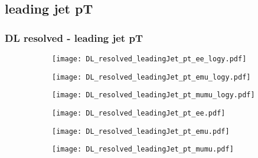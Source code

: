 \documentclass[aspectratio=169,8pt]{beamer}
\begin{document}
\subsection{leading jet pT}
\begin{frame}
\frametitle{DL resolved - leading jet pT}
\begin{figure}
\captionsetup[subfigure]{labelformat=empty}
\begin{subfigure}{0.32\textwidth}
\texttt{[image: DL\_resolved\_leadingJet\_pt\_ee\_logy.pdf]}
\vspace*{-0.15cm}
\end{subfigure}
\hfil
\begin{subfigure}{0.32\textwidth}
\texttt{[image: DL\_resolved\_leadingJet\_pt\_emu\_logy.pdf]}
\vspace*{-0.15cm}
\end{subfigure}
\hfil
\begin{subfigure}{0.32\textwidth}
\texttt{[image: DL\_resolved\_leadingJet\_pt\_mumu\_logy.pdf]}
\vspace*{-0.15cm}
\end{subfigure}
\hfil
\begin{subfigure}{0.32\textwidth}
\texttt{[image: DL\_resolved\_leadingJet\_pt\_ee.pdf]}
\vspace*{-0.15cm}
\end{subfigure}
\hfil
\begin{subfigure}{0.32\textwidth}
\texttt{[image: DL\_resolved\_leadingJet\_pt\_emu.pdf]}
\vspace*{-0.15cm}
\end{subfigure}
\hfil
\begin{subfigure}{0.32\textwidth}
\texttt{[image: DL\_resolved\_leadingJet\_pt\_mumu.pdf]}
\vspace*{-0.15cm}
\end{subfigure}
\hfil
\end{figure}
\end{frame}
\newpage
\end{document}
